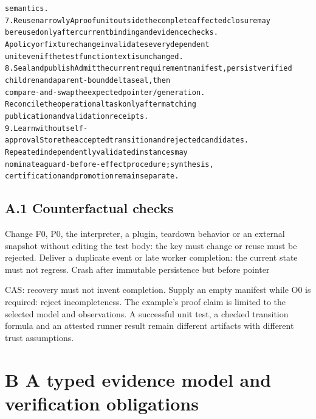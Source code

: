 \documentclass{article}
\begin{document}
\begin{alltt}
                                            semantics.
7. Reuse narrowly                           A proof unit outside the complete affected closure may
                                            be reused only after current binding and evidence checks.
                                            A policy or fixture change invalidates every dependent
                                            unit even if the test function text is unchanged.
8. Seal and publish                         Admit the current requirement manifest, persist verified
                                            children and a parent-bound delta seal, then
                                            compare-and-swap the expected pointer/generation.
                                            Reconcile the operational task only after matching
                                            publication and validation receipts.
9. Learn without self-approval              Store the accepted transition and rejected candidates.
                                            Repeated independently validated instances may
                                            nominate a guard-before-effect procedure; synthesis,
                                            certification and promotion remain separate.
\end{alltt}\endgroup


\subsection*{A.1 Counterfactual checks}

Change F0, P0, the interpreter, a plugin, teardown behavior or an external snapshot without editing
the test body: the key must change or reuse must be rejected. Deliver a duplicate event or late worker
completion: the current state must not regress. Crash after immutable persistence but before pointer


CAS: recovery must not invent completion. Supply an empty manifest while O0 is required: reject
incompleteness.
The example’s proof claim is limited to the selected model and observations. A successful unit test, a
checked transition formula and an attested runner result remain different artifacts with different trust
assumptions.


\section*{B A typed evidence model and verification obligations}
\end{document}
